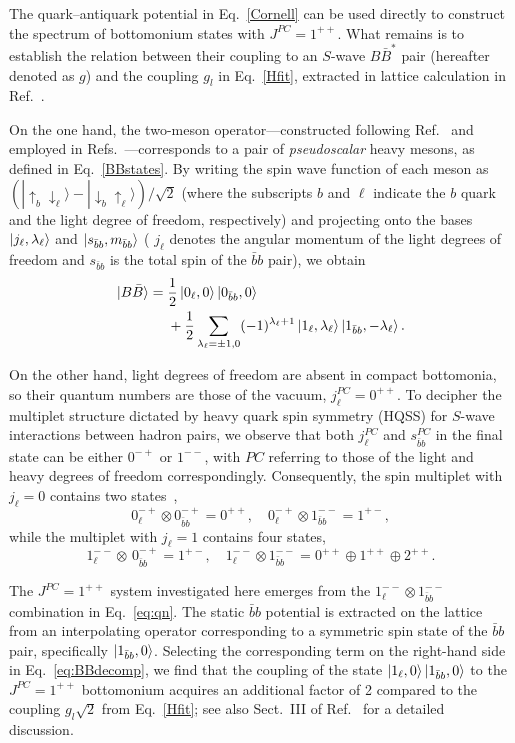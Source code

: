 \documentclass[aps,prd,showpacs,amsmath,twocolumn,superscriptaddress,floatfix,nofootinbib,notitlepage]{revtex4-2}
\newcommand{\be}{\begin{equation}}
\newcommand{\ee}{\end{equation}}
\begin{document}
The quark--antiquark potential in Eq.~\eqref{Cornell} can be used directly to construct the spectrum of bottomonium states with $J^{PC}=1^{++}$. What remains is to establish the relation between their coupling to an $S$-wave $B\bar{B}^*$ pair (hereafter denoted as $g$) and the coupling $g_l$ in Eq.~\eqref{Hfit}, extracted in lattice calculation in Ref.~\cite{Bulava:2024jpj}.

On the one hand, the two-meson operator---constructed following Ref.~\cite{Bali:2005fu} and employed in Refs.~\cite{Bulava:2019iut,Bulava:2024jpj}---corresponds to a pair of \emph{pseudoscalar} heavy mesons, as defined in Eq.~\eqref{BBstates}.
By writing the spin wave function of each meson as $(|{\uparrow_b\downarrow_\ell}\rangle-|{\downarrow_b\uparrow_\ell}\rangle)/\sqrt2$ (where the subscripts $b$ and $\ell$ indicate the $b$ quark and the light degree of freedom, respectively) and projecting onto the bases $\ket{j_\ell, \lambda_\ell}$ 
and $\ket{s_{\bar{b}b},m_{\bar{b}b}}$ ( $j_\ell$ denotes the angular momentum of the light degrees of freedom and $s_{\bar{b}b}$ is the total spin of the $\bar{b}b$ pair), we obtain
\be
\begin{split}
\ket{B\bar{B}}={}&\frac12\ket{0_\ell,0}\ket{0_{\bar{b}b},0}\\
&+\frac12\sum_{\lambda_\ell=\pm1,0}(-1)^{\lambda_\ell+1}
\ket{1_\ell,\lambda_\ell}\ket{1_{\bar{b}b},-\lambda_\ell}.
\label{eq:BBdecomp}
\end{split}
\ee

On the other hand, light degrees of freedom are absent in compact bottomonia, so their quantum numbers are those of the vacuum, $j_{\ell}^{PC}=0^{++}$. 
To decipher the multiplet structure dictated by heavy quark spin symmetry (HQSS) for $S$-wave interactions between hadron pairs, we observe that both $j_{\ell}^{PC}$ and $s_{\bar{b}b}^{PC}$ in the final state can be either $0^{-+}$ or $1^{--}$, with $PC$ referring to those of the light and heavy degrees of freedom correspondingly. Consequently, the spin multiplet with $j_{\ell}=0$ contains two states~\cite{Bondar:2011ev,Guo:2017jvc},
\be
0_{\ell}^{-+} \otimes 0_{\bar{b}b}^{-+}=0^{++}, \quad 0_{\ell}^{-+} \otimes 1_{\bar{b}b}^{--}=1^{+-},
\label{eq:qn0}
\ee
while the multiplet with $j_{\ell}=1$ contains four states,
\be
1_{\ell}^{--} \otimes\, 0_{\bar{b}b}^{-+}=1^{+-}, \quad 1_{\ell}^{--} \otimes 1_{\bar{b}b}^{--}=0^{++} \oplus 1^{++} \oplus 2^{++}.
\label{eq:qn}
\ee

The $J^{PC}=1^{++}$ system investigated here emerges from the $1_{\ell}^{--} \otimes 1_{\bar{b}b}^{--}$ combination in Eq.~\eqref{eq:qn}.
The static $\bar{b}b$ potential is extracted on the lattice~\cite{Bulava:2019iut, Bulava:2024jpj} from an interpolating operator corresponding to a symmetric spin state of the $\bar{b}b$ pair, specifically $\ket{1_{\bar{b}b},0}$. Selecting
the corresponding term on the right-hand side in Eq.~\eqref{eq:BBdecomp}, we find that the coupling of the state $\ket{1_\ell,0}\ket{1_{\bar{b}b},0}$ to the $J^{PC}=1^{++}$ bottomonium acquires an additional factor of 2 compared to the coupling $g_l\sqrt{2}$ from Eq.~\eqref{Hfit}; see also Sect.~III of Ref.~\cite{Bicudo:2019ymo} for a detailed discussion.
\end{document}
